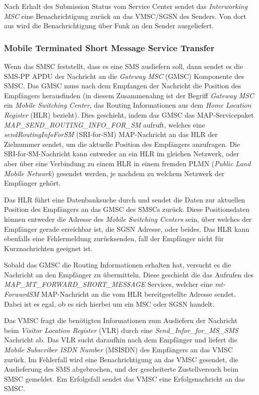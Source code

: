 \documentclass[german,12pt,a4paper]{article}
\begin{document}
Nach Erhalt des Submission Status vom Service Center sendet das \textit{Interworking MSC} eine Benachrichtigung
zurück an das VMSC/SGSN des Senders. Von dort aus wird die Benachrichtigung über Funk an den Sender
ausgeliefert.


\subsubsection{Mobile Terminated Short Message Service Transfer}
Wenn das SMSC feststellt, dass es eine SMS ausliefern soll, dann sendet es die SMS-PP APDU der Nachricht 
an die \textit{Gateway MSC} (GMSC) Komponente des SMSC\cite{3gpp:techrel}. Das GMSC muss nach dem Empfangen der Nachricht die Position
des Empfängers herausfinden (in diesem Zusammenahng ist der Begriff \textit{Gateway MSC} ein \textit{Mobile Switching Center}, das Routing 
Informationen aus dem \textit{Home Location Register} (HLR) bezieht). Dies geschieht, indem das GMSC das MAP-Servicepaket 
\textit{MAP\_SEND\_ROUTING\_INFO\_FOR\_SM} aufruft, welches eine \textit{sendRoutingInfoForSM} (SRI-for-SM) 
MAP-Nachricht an das HLR der Zielnummer sendet, um die aktuelle Position des Empfängers anzufragen.
Die SRI-for-SM-Nachricht kann entweder an ein HLR im gleichen Netzwerk, oder aber über eine Verbindung zu
einem HLR in einem fremden PLMN (\textit{Public Land Mobile Network}) gesendet werden, je nachdem zu welchem 
Netzwerk der Empfänger gehört.

Das HLR führt eine Datenbanksuche durch und sendet die Daten zur aktuellen Position des Empfängers an das 
GMSC des SMSCs zurück. Diese Positionsdaten können entweder die Adresse des \textit{Mobile Switching Centers} sein, über welches der 
Empfänger gerade erreichbar ist, die SGSN Adresse, oder beides. Das HLR kann ebenfalls eine Fehlermeldung 
zurücksenden, fall der Empfänger nicht für Kurznachrichten geeignet ist.

Sobald das GMSC die Routing Informationen erhalten hat, versucht es die Nachricht an den Empfänger zu 
übermitteln. Diese geschieht die das Aufrufen des \textit{MAP\_MT\_\-FORWARD\_SHORT\_MESSAGE} Services, welcher eine
\textit{mt-ForwardSM} MAP-Nachricht an die vom HLR bereitgestellte Adresse sendet. Dabei ist es egal, ob es sich 
hierbei um ein MSC oder SGSN handelt.

Das VMSC fragt die benötigten Informationen zum Ausliefern der Nachricht beim \textit{Visitor Location Register}
(VLR) durch eine \textit{Send\_Infor\_for\_MS\_SMS} Nachricht ab. Das VLR sucht daraufhin nach dem Empfänger und
liefert die \textit{Mobile Subscriber ISDN Number} (MSISDN) des Empfängers an das VMSC zurück. Im Fehlerfall wird 
eine Benachrichtigung an das VMSC gesendet, die Auslieferung des SMS abgebrochen, und der gescheiterte 
Zustellversuch beim SMSC gemeldet. Em Erfolgsfall sendet das VMSC eine Erfolgsnachricht an das SMSC.
\end{document}

